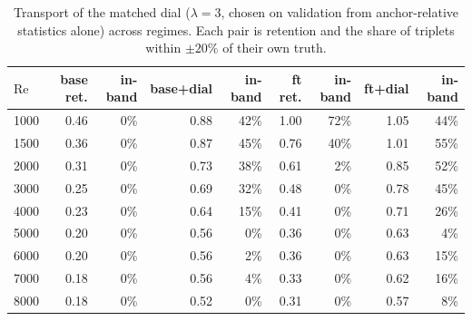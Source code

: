 \begin{table}[t]
  \centering
  \caption{Transport of the matched dial ($\lambda=3$, chosen on validation from anchor-relative statistics alone) across regimes. Each pair is retention and the share of triplets within $\pm20\%$ of their own truth.}
  \label{tab:transfer}
  \begin{tabular}{lrrrrrrrr}
    \toprule
    $\mathrm{Re}$ & base ret. & in-band & base+dial & in-band & ft ret. & in-band & ft+dial & in-band \\
    \midrule
    1000 & 0.46 & 0\% & 0.88 & 42\% & 1.00 & 72\% & 1.05 & 44\% \\
    1500 & 0.36 & 0\% & 0.87 & 45\% & 0.76 & 40\% & 1.01 & 55\% \\
    2000 & 0.31 & 0\% & 0.73 & 38\% & 0.61 & 2\% & 0.85 & 52\% \\
    3000 & 0.25 & 0\% & 0.69 & 32\% & 0.48 & 0\% & 0.78 & 45\% \\
    4000 & 0.23 & 0\% & 0.64 & 15\% & 0.41 & 0\% & 0.71 & 26\% \\
    5000 & 0.20 & 0\% & 0.56 & 0\% & 0.36 & 0\% & 0.63 & 4\% \\
    6000 & 0.20 & 0\% & 0.56 & 2\% & 0.36 & 0\% & 0.63 & 15\% \\
    7000 & 0.18 & 0\% & 0.56 & 4\% & 0.33 & 0\% & 0.62 & 16\% \\
    8000 & 0.18 & 0\% & 0.52 & 0\% & 0.31 & 0\% & 0.57 & 8\% \\
    \bottomrule
  \end{tabular}
\end{table}
